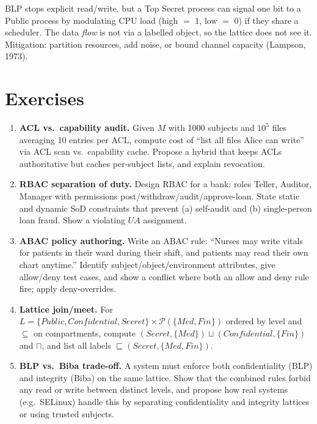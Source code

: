 \begin{example}
BLP stops explicit read/write, but a Top Secret process can signal one bit to a Public process by modulating CPU load (high $=$ 1, low $=$ 0) if they share a scheduler. The data \emph{flow} is not via a labelled object, so the lattice does not see it. Mitigation: partition resources, add noise, or bound channel capacity (Lampson, 1973).
\end{example}

\section{Exercises}
\label{sec:access-exercises}
\begin{enumerate}[label=E4.\arabic*, leftmargin=*, itemsep=0.6em]
    \item \textbf{ACL vs.\ capability audit.} Given $M$ with 1000 subjects and $10^5$ files averaging 10 entries per ACL, compute cost of ``list all files Alice can write'' via ACL scan vs.\ capability cache. Propose a hybrid that keeps ACLs authoritative but caches per-subject lists, and explain revocation.
    \item \textbf{RBAC separation of duty.} Design RBAC for a bank: roles Teller, Auditor, Manager with permissions post/withdraw/audit/approve-loan. State static and dynamic SoD constraints that prevent (a) self-audit and (b) single-person loan fraud. Show a violating $UA$ assignment.
    \item \textbf{ABAC policy authoring.} Write an ABAC rule: ``Nurses may write vitals for patients in their ward during their shift, and patients may read their own chart anytime.'' Identify subject/object/environment attributes, give allow/deny test cases, and show a conflict where both an allow and deny rule fire; apply deny-overrides.
    \item \textbf{Lattice join/meet.} For $L=\{Public, Confidential, Secret\}\times\mathcal{P}(\{Med,Fin\})$ ordered by level and $\subseteq$ on compartments, compute $(Secret,\{Med\})\sqcup(Confidential,\{Fin\})$ and $\sqcap$, and list all labels $\sqsubseteq(Secret,\{Med,Fin\})$.
    \item \textbf{BLP vs.\ Biba trade-off.} A system must enforce both confidentiality (BLP) and integrity (Biba) on the same lattice. Show that the combined rules forbid any read or write between distinct levels, and propose how real systems (e.g.\ SELinux) handle this by separating confidentiality and integrity lattices or using trusted subjects.
\end{enumerate}

